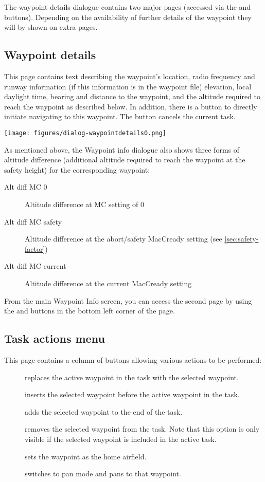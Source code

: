 The waypoint details dialogue contains two major pages (accessed via the
\bmenuw{$>$} and \bmenuw{$<$} buttons). Depending on the availability of further
details of the waypoint they will by shown on extra pages.

\subsection*{Waypoint details}\label{sec:waypointdetails}
This page contains text describing the waypoint's location, radio frequency and 
runway information (if this information is in the waypoint file) elevation, 
local daylight time, bearing and distance to the waypoint, and the altitude required 
to reach the waypoint as described below. In addition, there is a button 
 to directly initiate
navigating to this waypoint. The button cancels the current task. 
\begin{center}
\texttt{[image: figures/dialog-waypointdetails0.png]}
\end{center}

As mentioned above, the Waypoint info dialogue also shows three forms of altitude 
difference (additional
altitude required to reach the waypoint at the safety height) for
the corresponding waypoint:
\begin{description}
\item[Alt diff MC 0] Altitude difference at MC setting of 0
\item[Alt diff MC safety] Altitude difference at the abort/safety MacCready 
  setting (see \ref{sec:safety-factor})
\item[Alt diff MC current] Altitude difference at the current MacCready setting
\end{description}

From the main Waypoint Info screen, you can access the second page by using the 
\bmenuw{$>$} and \bmenuw{$<$} buttons in the bottom left corner of the page.
\subsection*{Task actions menu}  
This page contains a column of buttons allowing various actions to be performed:
\begin{description}
\item[] replaces the active waypoint in the task with 
  the selected waypoint.
\item[] inserts the selected waypoint before the active 
  waypoint in
  the task.
\item[] adds the selected waypoint to the end of the task.
\item[] removes the selected waypoint from the task.  
  Note that this option is only visible if the selected waypoint is included in 
  the active task.
\item[] sets the waypoint as the home airfield.
\item[] switches to pan mode and pans to that waypoint.
\end{description}

